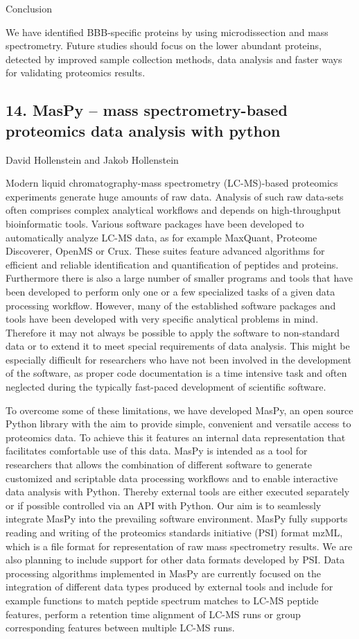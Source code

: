 Conclusion

We have identified BBB-specific proteins by using microdissection and mass spectrometry. Future studies should focus on the lower abundant proteins, detected by improved sample collection methods, data analysis and faster ways for validating proteomics results.

\subsection*{\color{eubicRed} 14. MasPy – mass spectrometry-based proteomics data analysis with python}
{\color{eubicGray}David Hollenstein and Jakob Hollenstein}

Modern liquid chromatography-mass spectrometry (LC-MS)-based proteomics
experiments generate huge amounts of raw data. Analysis of such raw data-sets
often comprises complex analytical workflows and depends on high-throughput
bioinformatic tools. Various software packages have been developed to
automatically analyze LC-MS data, as for example MaxQuant, Proteome Discoverer,
OpenMS or Crux. These suites feature advanced algorithms for efficient and
reliable identification and quantification of peptides and proteins. Furthermore
there is also a large number of smaller programs and tools that have been
developed to perform only one or a few specialized tasks of a given data
processing workflow. However, many of the established software packages and
tools have been developed with very specific analytical problems in mind.
Therefore it may not always be possible to apply the software to non-standard
data or to extend it to meet special requirements of data analysis. This might
be especially difficult for researchers who have not been involved in the
development of the software, as proper code documentation is a time intensive
task and often neglected during the typically fast-paced development of
scientific software.

To overcome some of these limitations, we have developed MasPy, an open source
Python library with the aim to provide simple, convenient and versatile access
to proteomics data. To achieve this it features an internal data representation
that facilitates comfortable use of this data. MasPy is intended as a tool for
researchers that allows the combination of different software to generate
customized and scriptable data processing workflows and to enable interactive
data analysis with Python. Thereby external tools are either executed separately
or if possible controlled via an API with Python. Our aim is to seamlessly
integrate MasPy into the prevailing software environment. MasPy fully supports
reading and writing of the proteomics standards initiative (PSI) format mzML,
which is a file format for representation of raw mass spectrometry results. We
are also planning to include support for other data formats developed by PSI.
Data processing algorithms implemented in MasPy are currently focused on the
integration of different data types produced by external tools and include for
example functions to match peptide spectrum matches to LC-MS peptide features,
perform a retention time alignment of LC-MS runs or group corresponding features
between multiple LC-MS runs.

